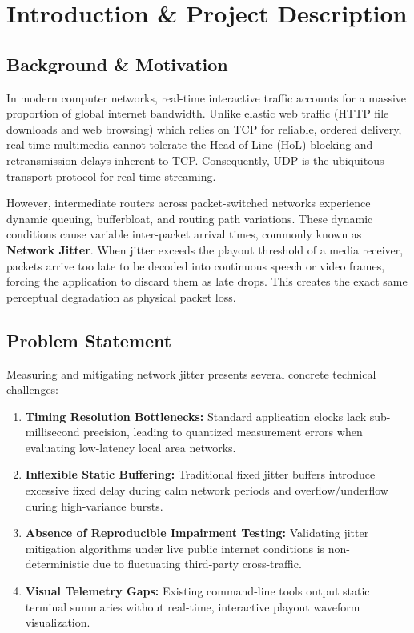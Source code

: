 \documentclass[12pt, a4paper]{report}
\begin{document}
\newpage
\chapter{Introduction \& Project Description}

\section{Background \& Motivation}
In modern computer networks, real-time interactive traffic accounts for a massive proportion of global internet bandwidth. Unlike elastic web traffic (HTTP file downloads and web browsing) which relies on TCP for reliable, ordered delivery, real-time multimedia cannot tolerate the Head-of-Line (HoL) blocking and retransmission delays inherent to TCP. Consequently, UDP is the ubiquitous transport protocol for real-time streaming.

However, intermediate routers across packet-switched networks experience dynamic queuing, bufferbloat, and routing path variations. These dynamic conditions cause variable inter-packet arrival times, commonly known as \textbf{Network Jitter}. When jitter exceeds the playout threshold of a media receiver, packets arrive too late to be decoded into continuous speech or video frames, forcing the application to discard them as late drops. This creates the exact same perceptual degradation as physical packet loss.

\section{Problem Statement}
Measuring and mitigating network jitter presents several concrete technical challenges:
\begin{enumerate}
    \item \textbf{Timing Resolution Bottlenecks:} Standard application clocks lack sub-millisecond precision, leading to quantized measurement errors when evaluating low-latency local area networks.
    \item \textbf{Inflexible Static Buffering:} Traditional fixed jitter buffers introduce excessive fixed delay during calm network periods and overflow/underflow during high-variance bursts.
    \item \textbf{Absence of Reproducible Impairment Testing:} Validating jitter mitigation algorithms under live public internet conditions is non-deterministic due to fluctuating third-party cross-traffic.
    \item \textbf{Visual Telemetry Gaps:} Existing command-line tools output static terminal summaries without real-time, interactive playout waveform visualization.
\end{enumerate}
\end{document}

